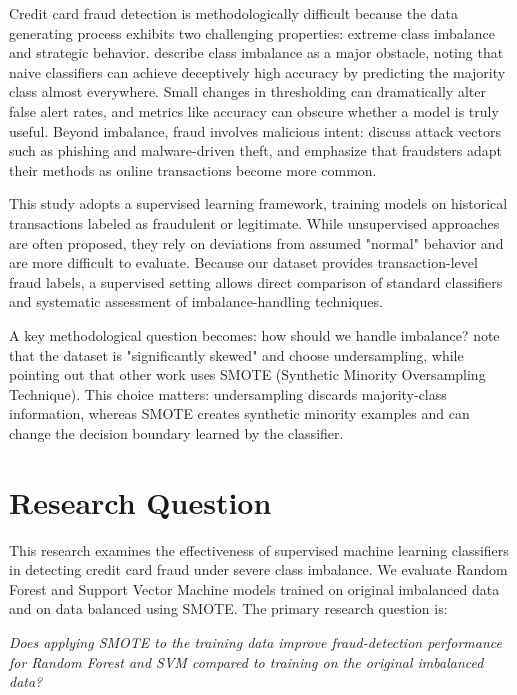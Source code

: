 \documentclass[oneside,12pt,parskip=half,american,numbers=noenddot]{scrreprt}
\begin{document}
Credit card fraud detection is methodologically difficult because the data generating process exhibits two challenging properties: extreme class imbalance and strategic behavior. \textcite{gunjan_credit_2022} describe class imbalance as a major obstacle, noting that naive classifiers can achieve deceptively high accuracy by predicting the majority class almost everywhere. Small changes in thresholding can dramatically alter false alert rates, and metrics like accuracy can obscure whether a model is truly useful. Beyond imbalance, fraud involves malicious intent: \textcite{xuan_random_2018} discuss attack vectors such as phishing and malware-driven theft, and \textcite{afriyie_supervised_2023} emphasize that fraudsters adapt their methods as online transactions become more common.

This study adopts a supervised learning framework, training models on historical transactions labeled as fraudulent or legitimate. While unsupervised approaches are often proposed, they rely on deviations from assumed "normal" behavior and are more difficult to evaluate. Because our dataset provides transaction-level fraud labels, a supervised setting allows direct comparison of standard classifiers and systematic assessment of imbalance-handling techniques.

A key methodological question becomes: how should we handle imbalance? \textcite{afriyie_supervised_2023} note that the dataset is "significantly skewed" and choose undersampling, while pointing out that other work uses SMOTE (Synthetic Minority Oversampling Technique). This choice matters: undersampling discards majority-class information, whereas SMOTE creates synthetic minority examples and can change the decision boundary learned by the classifier.

\section{Research Question}\label{Research Question}
This research examines the effectiveness of supervised machine learning classifiers in detecting credit card fraud under severe class imbalance. We evaluate Random Forest and Support Vector Machine models trained on original imbalanced data and on data balanced using SMOTE. The primary research question is:

\textit{Does applying SMOTE to the training data improve fraud-detection performance for Random Forest and SVM compared to training on the original imbalanced data?}
\end{document}

